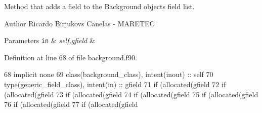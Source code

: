 Method that adds a field to the Background object\textquotesingle{}s field list. 

\begin{DoxyAuthor}{Author}
Ricardo Birjukovs Canelas -\/ M\+A\+R\+E\+T\+EC 
\end{DoxyAuthor}

\begin{DoxyParams}[1]{Parameters}
\mbox{\tt in}  & {\em self,gfield} & \\
\hline
\end{DoxyParams}


Definition at line 68 of file background.\+f90.


\begin{DoxyCode}
68     \textcolor{keywordtype}{implicit none}
69     \textcolor{keywordtype}{class}(background\_class), \textcolor{keywordtype}{intent(inout)} :: self
70     \textcolor{keywordtype}{type}(generic\_field\_class), \textcolor{keywordtype}{intent(in)} :: gfield
71     \textcolor{keywordflow}{if} (\textcolor{keyword}{allocated}(gfield%
72     \textcolor{keywordflow}{if} (\textcolor{keyword}{allocated}(gfield%
73     \textcolor{keywordflow}{if} (\textcolor{keyword}{allocated}(gfield%
74     \textcolor{keywordflow}{if} (\textcolor{keyword}{allocated}(gfield%
75     \textcolor{keywordflow}{if} (\textcolor{keyword}{allocated}(gfield%
76     \textcolor{keywordflow}{if} (\textcolor{keyword}{allocated}(gfield%
77     \textcolor{keywordflow}{if} (\textcolor{keyword}{allocated}(gfield%
\end{DoxyCode}
\mbox{\label{namespacebackground__mod_ad0096fb6a5a11854fd70a7ce58dc3000}} 
